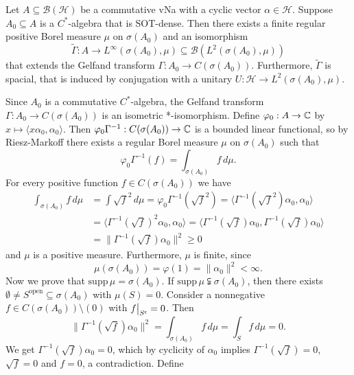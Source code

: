 \begin{theorem}
  Let $A \subseteq \mathcal{B}(\mathcal{H})$ be a commutative vNa with a cyclic vector $\alpha \in \mathcal{H}$.
  Suppose $A_0 \subseteq A$ is a $C^*$-algebra that is SOT-dense. Then there exists a finite regular positive Borel measure 
  $\mu$ on $\sigma(A_0)$ and an isomorphism $$\widetilde{\Gamma}: A \to L^\infty (\sigma (A_0), \mu) \subseteq \mathcal{B} (L^2 (\sigma(A_0), \mu))$$
  that extends the Gelfand transform $\Gamma: A_0 \to C(\sigma(A_0))$.
  Furthermore, $\widetilde{\Gamma}$ is spacial, that is induced by conjugation with a unitary 
  $U: \mathcal{H} \to L^2 (\sigma(A_0), \mu)$.
\end{theorem}

\begin{myproof}
  Since $A_0$ is a commutative $C^*$-algebra, the Gelfand transform $\Gamma: A_0 \to C(\sigma(A_0))$
  is an isometric *-isomorphism. Define $\varphi_0: A \to \mathbb {C}$ by $x \mapsto \langle x \alpha_0, \alpha_0\rangle$.
  Then $\varphi_0 \Gamma^{-1} : C(\sigma(A_0)) \to \mathbb {C}$ is a bounded linear functional, so by Riesz-Markoff 
  there exists a regular Borel measure $\mu$ on $\sigma(A_0)$ such that 
  $$\varphi_0 \Gamma^{-1} (f) = \int_{\sigma(A_0)} f\, d\mu.$$
  For every positive function $f \in C(\sigma(A_0))$ we have 
  \begin{align*}
    \int_{\sigma(A_0)} f\, d\mu &= \int \sqrt{f}^2\, d\mu = \varphi_0 \Gamma^{-1} (\sqrt{f}^2) = \langle \Gamma^{-1} (\sqrt{f}^2) \alpha_0, \alpha_0 \rangle\\
    &= \langle \Gamma^{-1} (\sqrt{f}) ^2 \alpha_0, \alpha_0\rangle = \langle \Gamma^{-1} (\sqrt{f}) \alpha_0, \Gamma^{-1} (\sqrt{f}) \alpha_0\rangle\\
    &= \| \Gamma^{-1} (\sqrt{f}) \alpha_0\|^2 \geq 0
  \end{align*}
  and $\mu$ is a positive measure. Furthermore, $\mu$ is finite, since 
  $$\mu(\sigma(A_0)) = \varphi(1) = \|\alpha_0\|^2 < \infty.$$
  Now we prove that $\mathrm{supp}\, \mu = \sigma(A_0)$.
  If $\mathrm{supp}\, \mu \subsetneqq \sigma(A_0)$, then there exists $\emptyset \neq S^{\mathrm{open}} \subseteq \sigma(A_0)$
  with $\mu (S) = 0$. Consider a nonnegative $f \in C(\sigma(A_0)) \setminus (0)$ with $f\big|_{{S}^{\mathsf{c}}} = 0$.
  Then $$\| \Gamma^{-1} (\sqrt{f}) \alpha_0 \|^2 = \int_{\sigma(A_0)} f\, d\mu = \int_S f\, d\mu = 0.$$
  We get $\Gamma^{-1} (\sqrt{f}) \alpha_0 = 0$, which by cyclicity of $\alpha_0$ implies $\Gamma^{-1} (\sqrt{f}) = 0$,
  $\sqrt{f} = 0$ and $f = 0$, a contradiction. Define 

\end{myproof}
